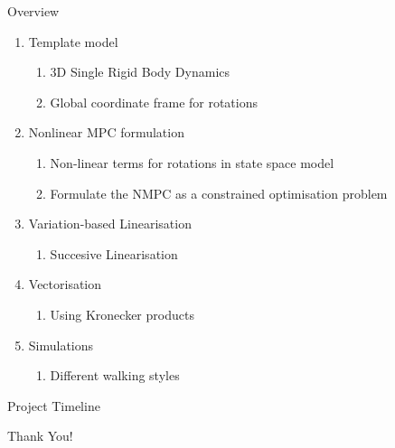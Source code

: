 \documentclass{beamer}
\begin{document}
\begin{frame}{Overview}
    

    \setlength{\itemsep}{1em}
    \setlength{\parskip}{2pt} 
    \begin{enumerate}\small
        \item Template model
            \begin{enumerate}\scriptsize
                \item 3D Single Rigid Body Dynamics
                \item Global coordinate frame for rotations
            \end{enumerate}
        \item Nonlinear MPC formulation
            \begin{enumerate}\scriptsize
                \item Non-linear terms for rotations in state space model
                \item Formulate the NMPC as a constrained optimisation problem
            \end{enumerate}
        \item Variation-based Linearisation
            \begin{enumerate}\scriptsize
                \item Succesive Linearisation
            \end{enumerate}
        \item Vectorisation
            \begin{enumerate}\scriptsize
                \item Using Kronecker products
            \end{enumerate}
        \item Simulations
            \begin{enumerate}\scriptsize
                \item Different walking styles
            \end{enumerate}
    \end{enumerate}
    
\end{frame}


\begin{frame}{Project Timeline}
    
\end{frame}


\begin{frame}
    \LARGE{Thank You!}
\end{frame}
\end{document}

